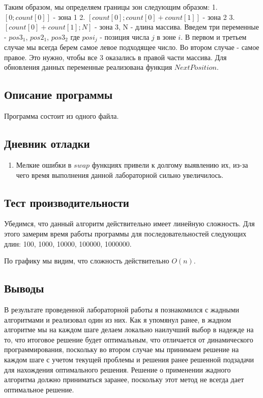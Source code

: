 \documentclass[12pt]{article}
\begin{document}
    Таким образом, мы определяем границы зон следующим образом:
        1. $[0; count[0]]$ - зона 1
        2. $[count[0]; count[0] + count[1]]$ - зона 2
        3. $[count[0] + count[1]; N]$ - зона 3, N - длина массива.
    Введем три переменные - $pos3_1$, $pos2_1$, $pos3_2$ где $posi_j$ - позиция числа $j$ в зоне $i$. В первом и третьем случае
    мы всегда берем самое левое подходящее число. Во втором случае - самое правое. Это нужно, чтобы все 3 оказались в правой части массива.
    Для обновления данных переменные реализована функция $NextPosition$.

    \subsection*{Описание программы}

    Программа состоит из одного файла.

    \subsection*{Дневник отладки}

    \begin{enumerate}
    \item Мелкие ошибки в $swap$ функциях привели к долгому выявлению их, из-за чего время выполнения данной лабораторной сильно увеличилось.
    \end{enumerate}


    \subsection*{Тест производительности}

    Убедимся, что данный алгоритм действительно имеет линейную сложность. Для этого замерим время работы программы для
    последовательностей следующих длин: 100, 1000, 10000, 100000, 1000000.
    

    По графику мы видим, что сложность действительно $O(n)$.

    \subsection*{Выводы}

    В результате проведенной лабораторной работы я познакомился с жадными алгоритмами и реализовал
    один из них. Как я упомянул ранее, в жадном алгоритме мы на каждом шаге делаем локально наилучший выбор в надежде на то, что
    итоговое решение будет оптимальным, что отличается от динамического программирования, поскольку во втором случае мы принимаем решение
    на каждом шаге с учетом текущей проблемы и решения ранее решенной подзадачи для нахождения оптимального решения. Решение о применении жадного алгоритма должно приниматься заранее,
    поскольку этот метод не всегда дает оптимальное решение.
\end{document}
